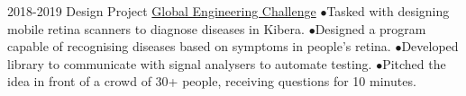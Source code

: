 \documentclass[9pt]{developercv} %
\begin{document}
\begin{entrylist}
		{2018-2019}
		{Design Project}
		{\href{https://www.sheffield.ac.uk/engineering/study/global-engineering-challenge}{Global Engineering Challenge}}
		{
			$\bullet$\hspace*{0.5cm}Tasked with designing mobile retina scanners to diagnose diseases in Kibera.\newline
			$\bullet$\hspace*{0.5cm}Designed a program capable of recognising diseases based on symptoms in people's retina.\newline
			$\bullet$\hspace*{0.5cm}Developed library to communicate with signal analysers to automate testing.\newline
			$\bullet$\hspace*{0.5cm}Pitched the idea in front of a crowd of 30+ people, receiving questions for 10 minutes.
		}	
\end{entrylist}
\end{document}
